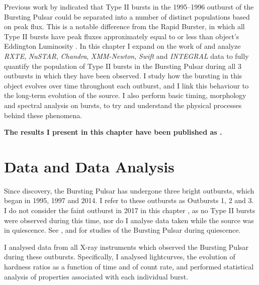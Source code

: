 \par Previous work by \citet{Giles_BP} indicated that Type II bursts in the 1995--1996 outburst of the Bursting Pulsar could be separated into a number of distinct populations based on peak flux.  This is a notable difference from the Rapid Burster, in which all Type II bursts have peak fluxes approximately equal to or less than object's Eddington Luminosity \citep{Tan_RBBursts}.  In this chapter I expand on the work of \citet{Giles_BP} and analyze \indexrxte\textit{RXTE}, \indexnustar\textit{NuSTAR}, \indexchandra\textit{Chandra}, \indexxmm\textit{XMM-Newton}, \indexswift\textit{Swift} and \indexintegral\textit{INTEGRAL} data to fully quantify the population of Type II bursts in the Bursting Pulsar during all 3 outbursts in which they have been observed.  I study how the bursting in this object evolves over time throughout each outburst, and I link this behaviour to the long-term evolution of the source.  I also perform basic timing, morphology and spectral analysis on bursts, to try and understand the physical processes behind these phenomena.
\par \textbf{The results I present in this chapter have been published as \citet{BPpaper}.}

\section{Data and Data Analysis}

\par Since discovery, the Bursting Pulsar has undergone three bright outbursts, which began in 1995, 1997 and 2014.  I refer to these outbursts as Outbursts 1, 2 and 3.  I do not consider the faint outburst in 2017 in this chapter \citep{Sanna_BPOutburst}, as no Type II bursts were observed during this time, nor do I analyse data taken while the source was in quiescence.  See \citet{Daigne_BPQ}, \citet{Wijnands_BPQ} and \citet{Degenaar_BPQuiescence} for studies of the Bursting Pulsar during quiescence.
\par I analysed data from all X-ray instruments which observed the Bursting Pulsar during these outbursts.  Specifically, I analysed lightcurves, the evolution of hardness ratios as a function of time and of count rate, and performed statistical analysis of properties associated with each individual burst.

